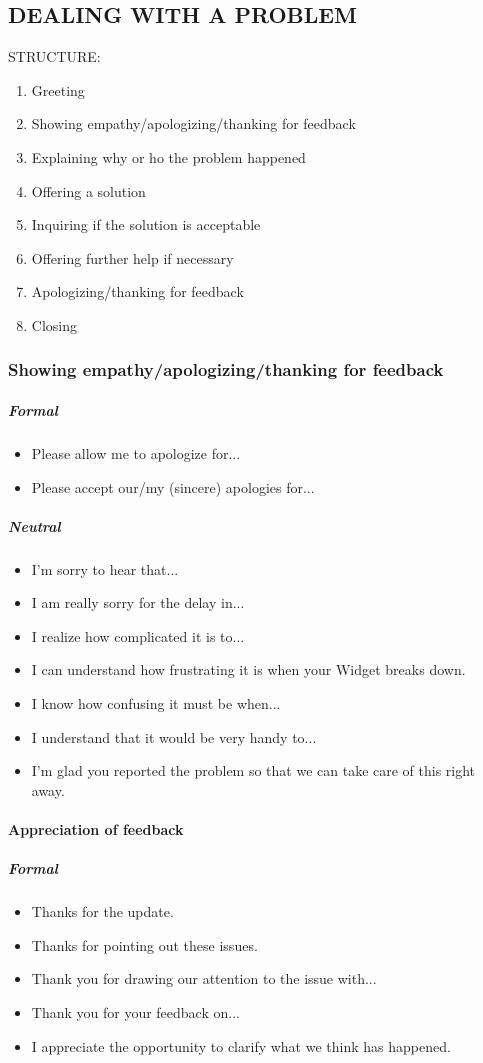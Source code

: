 \subsection{DEALING WITH A PROBLEM}

STRUCTURE:
\begin{enumerate}
\item Greeting
\item Showing empathy/apologizing/thanking for feedback
\item Explaining why or ho the problem happened
\item Offering a solution
\item Inquiring if the solution is acceptable
\item Offering further help if necessary
\item Apologizing/thanking for feedback
\item Closing
\end{enumerate}
\subsubsection{Showing empathy/apologizing/thanking for feedback}
\subparagraph{Formal}
\begin{itemize}
\item Please allow me to apologize for...
\item Please accept our/my (sincere) apologies for...
\end{itemize}

\subparagraph{Neutral}
\begin{itemize}
\item I'm sorry to hear that...
\item I am really sorry for the delay in...
\item I realize how complicated it is to...
\item I can understand how frustrating it is when your Widget breaks down.
\item I know how confusing it must be when...
\item I understand that it would be very handy to...
\item I'm glad you reported the problem so that we can take care of this right away.
\end{itemize}

\paragraph{Appreciation of feedback}
\subparagraph{Formal}
\begin{itemize}
\item Thanks for the update.
\item Thanks for pointing out these issues.
\item Thank you for drawing our attention to the issue with...
\item Thank you for your feedback on...
\item I appreciate the opportunity to clarify what we think has happened.
\end{itemize}

